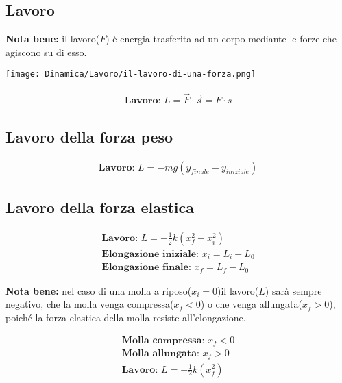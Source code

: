 \subsection{Lavoro}

\textbf{Nota bene: } il lavoro($F$) è energia trasferita ad un corpo mediante le forze che agiscono su di esso. \\
\begin{center}
    \texttt{[image: Dinamica/Lavoro/il-lavoro-di-una-forza.png]}
\end{center}
\begin{gather*}
    \textbf{Lavoro: } L = \vec{F} \cdot \vec{s} = F \cdot  s
\end{gather*}

\subsection{Lavoro della forza peso}

\begin{gather*}
    \textbf{Lavoro: } L = -mg(y_{finale} - y_{iniziale})
\end{gather*}

\subsection{Lavoro della forza elastica}

\begin{gather*}
    \textbf{Lavoro: } L = - \frac{1}{2} k (x_f^2 - x_i^2) \\
    \textbf{Elongazione iniziale: } x_i = L_i - L_0 \\
    \textbf{Elongazione finale: } x_f = L_f - L_0
\end{gather*}

\textbf{Nota bene: } nel caso di una molla a riposo($x_i = 0$)il lavoro($L$) sarà sempre negativo, che la molla venga compressa($x_f < 0$) o che venga allungata($x_f > 0$), poiché la forza elastica della molla resiste all'elongazione.

\begin{gather*}
    \textbf{Molla compressa: } x_f < 0 \\
    \textbf{Molla allungata: } x_f > 0 \\
    \textbf{Lavoro: } L = - \frac{1}{2} k (x_f^2)
\end{gather*}